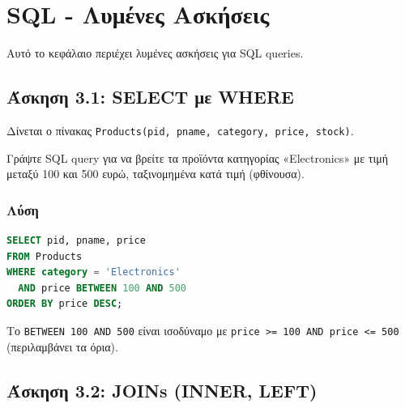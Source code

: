 
\chapter{SQL - Λυμένες Ασκήσεις}
\label{ch:sql-exercises}

Αυτό το κεφάλαιο περιέχει λυμένες ασκήσεις για SQL queries.

\section{Άσκηση 3.1: SELECT με WHERE}

\begin{formulabox}[Εκφώνηση]
Δίνεται ο πίνακας \texttt{Products(pid, pname, category, price, stock)}.

Γράψτε SQL query για να βρείτε τα προϊόντα κατηγορίας «Electronics» με τιμή μεταξύ
100 και 500 ευρώ, ταξινομημένα κατά τιμή (φθίνουσα).
\end{formulabox}

\subsection*{Λύση}

\begin{lstlisting}[language=SQL]
SELECT pid, pname, price
FROM Products
WHERE category = 'Electronics'
  AND price BETWEEN 100 AND 500
ORDER BY price DESC;
\end{lstlisting}

\begin{infobox}[BETWEEN]
Το \texttt{BETWEEN 100 AND 500} είναι ισοδύναμο με \texttt{price >= 100 AND price <= 500}
(περιλαμβάνει τα όρια).
\end{infobox}

\section{Άσκηση 3.2: JOINs (INNER, LEFT)}

